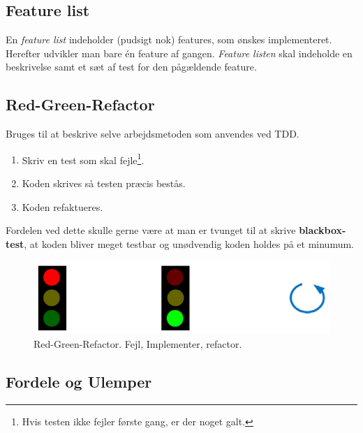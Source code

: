 \subsection{Feature list}
En \textit{feature list} indeholder (pudsigt nok) features, som ønskes implementeret. Herefter udvikler man bare én feature af gangen. \textit{Feature listen} skal indeholde en beskrivelse samt et sæt af test for den pågældende feature.

\subsection{Red-Green-Refactor}
Bruges til at beskrive selve arbejdsmetoden som anvendes ved TDD.

\begin{enumerate}
	\item Skriv en test som skal fejle\footnote{Hvis testen ikke fejler første gang, er der noget galt.}.
	\item Koden skrives så testen præcis bestås.
	\item Koden refaktueres.
\end{enumerate}

Fordelen ved dette skulle gerne være at man er tvunget til at skrive \textbf{blackbox-test}, at koden bliver meget testbar og unødvendig koden holdes på et minumum.

\begin{figure}[H]
\centering
\includegraphics[width=0.7\linewidth]{figs/redgreen}
\caption{Red-Green-Refactor. Fejl, Implementer, refactor.}
\label{fig:redgreen}
\end{figure}

\subsection{Fordele og Ulemper}

